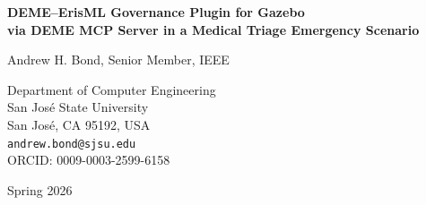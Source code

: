 \documentclass[11pt]{article}
\begin{document}
\begin{titlepage}
\centering
\vspace*{2cm}

{\LARGE\bfseries DEME--ErisML Governance Plugin for Gazebo\\[0.5em]
\large via DEME MCP Server in a Medical Triage Emergency Scenario}

\vspace{1.5cm}

{\Large Andrew H. Bond, Senior Member, IEEE}

\vspace{0.5cm}

{\large
Department of Computer Engineering\\
San Jos\'e State University\\
San Jos\'e, CA 95192, USA\\[0.3cm]
\texttt{andrew.bond@sjsu.edu}\\[0.3cm]
ORCID: 0009-0003-2599-6158
}

\vspace{1cm}

{\large Spring 2026}

\vspace{2cm}

\begin{abstract}
This whitepaper describes the \textbf{DEME--ErisML Governance Plugin for Gazebo}, a real-time ethical oversight layer for autonomous agents operating in the Gazebo robotics simulator. The plugin connects Gazebo simulations to a \textbf{DEME MCP (Moral Control Plane) server} running the \textbf{ErisML} library, which implements DEME's multi-dimensional \emph{moral landscape} framework.

We focus on a \textbf{``Medical Triage Emergency''} scenario in which an autonomous triage agent must allocate scarce critical-care resources among multiple patients under time pressure. The plugin intercepts candidate actions in the simulation, converts state into structured \textbf{EthicalFacts}, queries the DEME MCP server, and enforces \textbf{vetoes and ranked choices} in real time. This enables researchers to prototype governance profiles, test learning agents under hard ethical constraints, and generate tamper-evident decision logs for analysis and audit. The result is a complete loop from \textbf{policy definition} to \textbf{ethically governed behavior} in a realistic robotics simulation environment.
\end{abstract}

\vfill


\end{titlepage}
\end{document}
